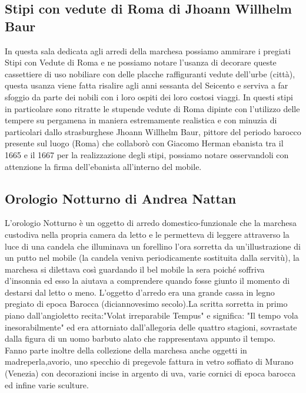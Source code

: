 \documentclass[hidelinks,12pt,a4paper]{article}
\begin{document}
\begin{flushleft}
			\subsection{Stipi con vedute di Roma di Jhoann Willhelm Baur}
			In questa sala dedicata agli arredi della marchesa possiamo ammirare i pregiati Stipi con Vedute di Roma e ne possiamo notare l'usanza di decorare queste cassettiere di uso nobiliare con delle placche raffiguranti vedute dell'urbe (città), questa usanza viene fatta risalire agli anni sessanta del Seicento e serviva a far sfoggio da parte dei nobili con i loro ospiti dei loro costosi viaggi. In questi stipi in particolare sono ritratte le stupende vedute di Roma dipinte con l'utilizzo delle tempere su pergamena in maniera estremamente realistica e con minuzia di particolari dallo strasburghese Jhoann Willhelm Baur, pittore del periodo barocco presente sul luogo (Roma) che collaborò con Giacomo Herman ebanista tra il 1665 e il 1667 per la realizzazione degli stipi, possiamo notare osservandoli con attenzione la firma dell'ebanista all'interno del mobile.
	
			\subsection{Orologio Notturno di Andrea Nattan}
			L'orologio Notturno è un oggetto di arredo domestico-funzionale che la marchesa custodiva nella propria camera da letto e le permetteva di leggere attraverso la luce di una candela che illuminava un forellino l'ora sorretta da un'illustrazione di un putto nel mobile (la candela veniva periodicamente sostituita dalla servitù), la marchesa si dilettava così guardando il bel mobile la sera poiché soffriva d'insonnia ed esso la aiutava a comprendere quando fosse giunto il momento di destarsi dal letto o meno. L'oggetto d'arredo era una grande cassa in legno pregiato di epoca Barocca (diciannovesimo secolo).La scritta sorretta in primo piano dall'angioletto recita:"Volat irreparabile Tempus" e significa: "Il tempo vola inesorabilmente" ed era attorniato dall'allegoria delle quattro stagioni, sovrastate dalla figura di un uomo barbuto alato che rappresentava appunto il tempo.\\
			Fanno parte inoltre della collezione della marchesa anche oggetti in madreperla,avorio, uno specchio di pregevole fattura in vetro soffiato di Murano (Venezia) con decorazioni incise in argento di uva, varie cornici di epoca barocca ed infine varie sculture.
	

\end{flushleft}
\end{document}
